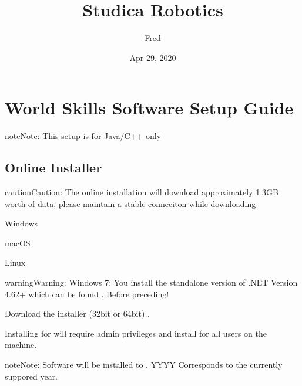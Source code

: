 \documentclass[letterpaper,10pt,english]{sphinxmanual}
\title{Studica Robotics}
\date{Apr 29, 2020}
\author{Fred}
\begin{document}
\pagestyle{empty}
\sphinxmaketitle
\pagestyle{plain}
\sphinxtableofcontents
\pagestyle{normal}
\label{\detokenize{index::doc}}



\chapter{World Skills Software Setup Guide}
\label{\detokenize{docs/WorldSkills/setup:world-skills-software-setup-guide}}\label{\detokenize{docs/WorldSkills/setup::doc}}
\begin{sphinxadmonition}{note}{Note:}
This setup is for Java/C++ only
\end{sphinxadmonition}


\section{Online Installer}
\label{\detokenize{docs/WorldSkills/setup:online-installer}}
\begin{sphinxadmonition}{caution}{Caution:}
The online installation will download approximately 1.3GB worth of data, please maintain a stable conneciton while downloading
\end{sphinxadmonition}

Windows

macOS

Linux

\begin{sphinxadmonition}{warning}{Warning:}
Windows 7: You  install the standalone version of .NET Version 4.62+ which can be found . Before preceding!
\end{sphinxadmonition}

Download the installer (32bit or 64bit) .


Installing for  will require admin privileges and install for all users on the machine.

\begin{sphinxadmonition}{note}{Note:}
Software will be installed to . YYYY Corresponds to the currently suppored year.
\end{sphinxadmonition}
\end{document}
